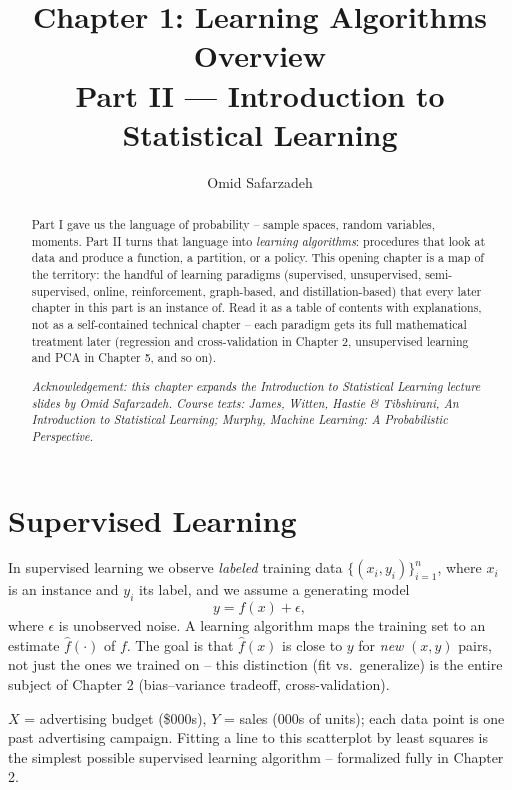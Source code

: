\documentclass[11pt]{article}
\title{Chapter 1: Learning Algorithms Overview \\ \large Part II --- Introduction to Statistical Learning}
\author{Omid Safarzadeh}
\date{}
\begin{document}
\maketitle

\begin{abstract}
\noindent
Part I gave us the language of probability -- sample spaces, random
variables, moments. Part II turns that language into \emph{learning
algorithms}: procedures that look at data and produce a function, a
partition, or a policy. This opening chapter is a map of the territory: the
handful of learning paradigms (supervised, unsupervised, semi-supervised,
online, reinforcement, graph-based, and distillation-based) that every
later chapter in this part is an instance of. Read it as a table of
contents with explanations, not as a self-contained technical chapter --
each paradigm gets its full mathematical treatment later (regression and
cross-validation in Chapter 2, unsupervised learning and PCA in Chapter 5,
and so on).

\emph{Acknowledgement: this chapter expands the Introduction to Statistical
Learning lecture slides by Omid Safarzadeh. Course texts: James, Witten,
Hastie \& Tibshirani, \emph{An Introduction to Statistical Learning}; Murphy,
\emph{Machine Learning: A Probabilistic Perspective}.}
\end{abstract}

\tableofcontents

\section{Supervised Learning}

\begin{definition}
In supervised learning we observe \emph{labeled} training data
$\{(x_i, y_i)\}_{i=1}^n$, where $x_i$ is an instance and $y_i$ its label, and
we assume a generating model
\[
  y = f(x) + \epsilon,
\]
where $\epsilon$ is unobserved noise. A learning algorithm maps the training
set to an estimate $\hat f(\cdot)$ of $f$. The goal is that $\hat f(x)$ is
close to $y$ for \emph{new} $(x,y)$ pairs, not just the ones we trained on --
this distinction (fit vs.\ generalize) is the entire subject of Chapter 2
(bias--variance tradeoff, cross-validation).
\end{definition}

\begin{example}[Advertising]
$X$ = advertising budget (\$000s), $Y$ = sales (000s of units); each data
point is one past advertising campaign. Fitting a line to this scatterplot
by least squares is the simplest possible supervised learning algorithm --
formalized fully in Chapter 2.
\end{example}
\end{document}
